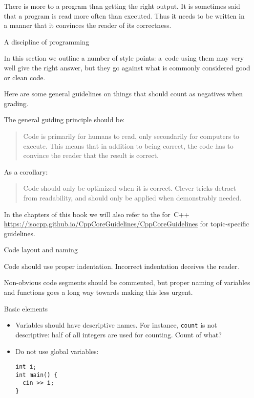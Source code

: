 There is more to a program than getting the right output.
It is sometimes said that a program is read more often than executed.
Thus it needs to be written in a manner that it convinces the reader
of its correctness.

 {A discipline of programming}

In this section we outline a number of style points:
a~code using them may very well
give the right answer, but they go against what is
commonly considered good or clean code.

Here are some general guidelines on things that should
count as negatives when grading.

The general guiding principle should be:
\begin{quote}
  Code is primarily for humans to read, only secondarily
  for computers to execute.
  This means that in addition to being correct,
  the code
  has to convince the reader that the result is correct.
\end{quote}

As a corollary:
\begin{quote}
  Code should only be optimized when it is correct.
  Clever tricks detract from readability,
  and should only be applied when demonstrably needed.
\end{quote}

\lstset{language=C++}

In the chapters of this book we will
also refer to the  for~C++
\url{https://isocpp.github.io/CppCoreGuidelines/CppCoreGuidelines}
for topic-specific guidelines.

 {Code layout and naming}

Code should use proper indentation.
Incorrect indentation deceives the reader.

Non-obvious code segments should be commented,
but proper naming of variables and functions
goes a long way towards making this less urgent.

 {Basic elements}

\begin{itemize}
\item
  Variables should have descriptive names.
  For instance, \lstinline{count} is not descriptive:
  half of all integers are used for counting.
  Count of what?
\item
  Do not use global variables:
\begin{lstlisting}
int i;
int main() {
  cin >> i;
}
\end{lstlisting}
\end{itemize}

